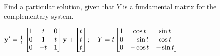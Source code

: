 \documentclass{ximera}
\begin{document}
 \begin{problem}\label{exer:10.7.19}
 Find a particular solution, given that $Y$ is a fundamental matrix for the complementary system.
 
$ {\bf y}'=\frac{1}{t}\begin{bmatrix}1&t&0\\0&1&t\\0&-t&1\end{bmatrix}{\bf y}
+\begin{bmatrix}
t\\t \\t \end{bmatrix};  \quad Y=t\begin{bmatrix}
1&\cos t&\sin t \\0&-\sin t&\cos t\\0&-\cos t&-\sin t
\end{bmatrix}$
\end{problem}
\end{document}
